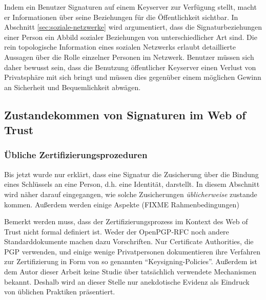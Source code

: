 Indem ein Benutzer Signaturen auf einem Keyserver zur Verfügung
stellt, macht er Informationen über seine Beziehungen für die
Öffentlichkeit sichtbar. In Abschnitt \ref{sec:soziale-netzwerke}
wird argumentiert, dass die Signaturbeziehungen einer Person ein
Abbild sozialer Beziehungen von unterschiedlicher Art sind. Die rein
topologische Information eines sozialen Netzwerks erlaubt detaillierte
Aussagen über die Rolle einzelner Personen im
Netzwerk\cite{Carrington2005}. Benutzer müssen sich daher bewusst
sein, dass die Benutzung öffentlicher Keyserver einen Verlust von
Privatsphäre mit sich bringt und müssen dies gegenüber einem
möglichen Gewinn an Sicherheit und Bequemlichkeit abwägen.

\subsection{Zustandekommen von Signaturen im Web of Trust}
\label{sec:sozi-komp-des}

\subsubsection{Übliche Zertifizierungsprozeduren}
\label{sec:ubliche-zert}

Bis jetzt wurde nur erklärt, dass eine Signatur die
Zusicherung über die Bindung eines Schlüssels an eine Person,
d.h. eine Identität, darstellt. In diesem Abschnitt wird näher
darauf eingegangen, wie solche Zusicherungen \emph{üblicherweise}
zustande kommen. Außerdem werden einige Aspekte (FIXME
Rahmenbedingungen)

Bemerkt werden muss, dass der Zertifizierungsprozess im Kontext des
Web of Trust nicht formal definiert ist. Weder der OpenPGP-RFC noch
andere Standarddokumente machen dazu Vorschriften. Nur Certificate
Authorities, die PGP verwenden, und einige wenige Privatpersonen
dokumentieren ihre Verfahren zur Zertifizierung in Form von
so genannten ``Keysigning-Policies''. Außerdem ist dem Autor dieser
Arbeit keine Studie über tatsächlich verwendete Mechanismen
bekannt. Deshalb wird an dieser Stelle nur anekdotische Evidenz
als Eindruck von üblichen Praktiken präsentiert.

